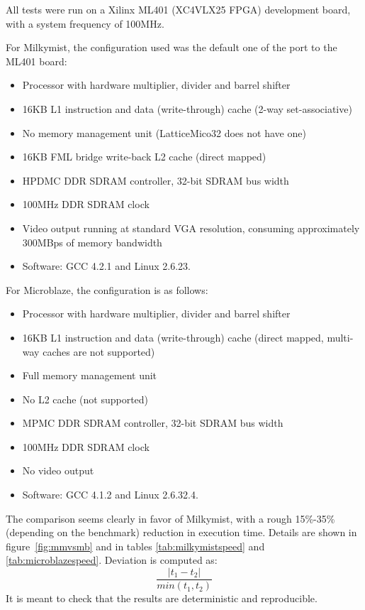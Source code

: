 \documentclass[a4paper,11pt]{kthesis}
\begin{document}
All tests were run on a Xilinx ML401 (XC4VLX25 FPGA) development board, with a system frequency of 100MHz.

For Milkymist, the configuration used was the default one of the port to the ML401 board:
\begin{itemize}
\item Processor with hardware multiplier, divider and barrel shifter
\item 16KB L1 instruction and data (write-through) cache (2-way set-associative)
\item No memory management unit (LatticeMico32 does not have one)
\item 16KB FML bridge write-back L2 cache (direct mapped)
\item HPDMC DDR SDRAM controller, 32-bit SDRAM bus width
\item 100MHz DDR SDRAM clock
\item Video output running at standard VGA resolution, consuming approximately 300MBps of memory bandwidth
\item Software: GCC 4.2.1 and Linux 2.6.23.
\end{itemize}

For Microblaze, the configuration is as follows:
\begin{itemize}
\item Processor with hardware multiplier, divider and barrel shifter
\item 16KB L1 instruction and data (write-through) cache (direct mapped, multi-way caches are not supported)
\item Full memory management unit
\item No L2 cache (not supported)
\item MPMC DDR SDRAM controller, 32-bit SDRAM bus width
\item 100MHz DDR SDRAM clock
\item No video output
\item Software: GCC 4.1.2 and Linux 2.6.32.4.
\end{itemize}

The comparison seems clearly in favor of Milkymist, with a rough 15\%-35\% (depending on the benchmark) reduction in execution time. Details are shown in figure~\ref{fig:mmvsmb} and in tables \ref{tab:milkymistspeed} and \ref{tab:microblazespeed}. Deviation is computed as:
\begin{equation}
\frac{|t_{1}-t_{2}|}{min(t_{1}, t_{2})}
\end{equation}
It is meant to check that the results are deterministic and reproducible.
\end{document}
